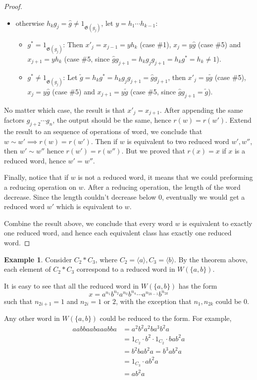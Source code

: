 \documentclass[a4paper,titlepage]{article}
\theoremstyle{remark}
\theoremstyle{definition}
\newtheorem{example}{Example}
\theoremstyle{definition}
\theoremstyle{plain}
\newcommand{\gid}{\mathfrak{G}}
\begin{document}
\begin{proof}
\begin{itemize}
      \item otherwise $h_k g_j = \hat{g} \neq 1_{\gid(g_j)}$, let $y = h_1 \cdots h_{k-1}$:
        \begin{itemize}
          \item $g^* = 1_{\gid(g_j)}$: Then $x'_j = x_{j-1} = y h_k$ (case \#1), 
            $x_j = y \hat{g}$ (case \#5) and
            $x_{j+1} = y h_k$ (case \#5, since $\hat{g} g_{j+1} = h_k g_j g_{j+1} = h_k g^* = h_k \neq 1$). 
          \item $g^* \neq 1_{\gid(g_j)}$: Let $\tilde{g} = h_k g^* = h_k g_j g_{j+1} = \hat{g} g_{j+1}$, 
            then $x'_j = y \tilde{g}$ (case \#5), 
            $x_j = y \hat{g}$ (case \#5) and
            $x_{j+1} = y \tilde{g}$ (case \#5, since $\hat{g} g_{j+1} = \tilde{g}$). 
      \end{itemize}
    \end{itemize}
    No matter which case, the result is that $x'_j = x_{j+1}$.
    After appending the same factors $g_{j+2} \cdots g_n$, the output should be the same, hence
    $r(w) = r(w')$. Extend the result to an sequence of operations of word, we conclude that
    $w \sim w' \implies r(w) = r(w')$. Then if $w$ is equivalent to two reduced word $w', w''$,
    then $w' \sim w''$ hence $r(w') = r(w'')$. But we proved that $r(x) = x$ if $x$ is a reduced word,
    hence $w' = w''$.

    Finally, notice that if $w$ is not a reduced word, it means that we could preforming a reducing
    operation on $w$. After a reducing operation, the length of the word decrease. Since the length
    couldn't decrease below $0$, eventually we would get a reduced word $w'$ which is equivalent to
    $w$.
    
    Combine the result above, we conclude that every word $w$ is equivalent to exactly one reduced
    word, and hence each equivalent class has exactly one reduced word.
  \end{proof}

  \begin{example}
    Consider $C_2 \ast C_3$, where $C_2 = \langle a \rangle, C_3 = \langle b \rangle$. By the
    theorem above, each element of $C_2 \ast C_3$ correspond to a reduced word in $W(\{a, b\})$.

    It is easy to see that all the reduced word in $W(\{a, b\})$ has the form
    \[ x = a^{n_1} b^{n_2} a^{n_3} b^{n_4} \cdots a^{n_{2k-1}} b^{n_{2k}} \]
    such that $n_{2i+1} = 1$ and $n_{2i} = 1 \text{ or } 2$, with the exception that
    $n_1, n_{2k}$ could be $0$.

    Any other word in $W(\{a, b\})$ could be reduced to the form. For example,
    \begin{align*}
      a a b b a a b a a a b b a &= a^2 b^2 a^2 b a^3 b^2 a \\
      &= 1_{C_2} \cdot b^2 \cdot 1_{C_2} \cdot b a b^2 a \\
      &= b^2 b a b^2 a = b^3 a b^2 a \\
      &= 1_{C_3} \cdot a b^2 a \\
      &= a b^2 a
    \end{align*}
  \end{example}
\end{document}
